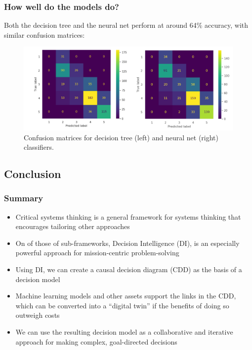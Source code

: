 \documentclass[
	11pt, %
]{beamer}
\begin{document}
\begin{frame}
	\frametitle{How well do the models do?}

	\begin{text}
	   Both the decision tree and the neural net perform at around 64\% accuracy, with similar confusion matrices:
	\end{text}

	\begin{figure}
	   \includegraphics[width=0.95\linewidth]{confusion_matrices.png}\caption{Confusion matrices for decision tree (left) and neural net (right) classifiers.}
	\end{figure}
\end{frame}

\subsection{Conclusion}

\begin{frame}
    \frametitle{Summary}

    \begin{itemize}
	    \item Critical systems thinking is a general framework for systems thinking that encourages tailoring other approaches
	    \item On of those of sub-frameworks, Decision Intelligence (DI), is an especially powerful approach for mission-centric problem-solving
	    \item Using DI, we can create a causal decision diagram (CDD) as the basis of a decision model
	    \item Machine learning models and other assets support the links in the CDD, which can be converted into a ``digital twin'' if the benefits of doing so outweigh costs
	    \item We can use the resulting decision model as a collaborative and iterative approach for making complex, goal-directed decisions
    \end{itemize}
\end{frame}
\end{document}

